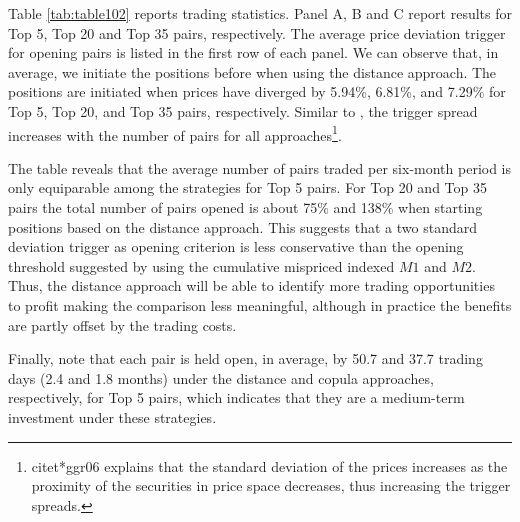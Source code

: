 \documentclass[a4paper]{article}
\begin{document}
	Table \ref{tab:table102} reports trading statistics. Panel A, B and C report results for Top 5, Top 20 and Top 35 pairs, respectively. The average price deviation trigger for opening pairs is listed in the first row of each panel. We can observe that, in average, we initiate the positions before when using the distance approach. The positions are initiated when prices have diverged by 5.94\%, 6.81\%, and 7.29\% for Top 5, Top 20, and Top 35 pairs, respectively. Similar to \citet*{ggr06}, the trigger spread increases with the number of pairs for all approaches\footnote{citet*{ggr06} explains that the standard deviation of the prices increases as the proximity of the securities in price space decreases, thus increasing the trigger spreads.}.
	
	The table reveals that the average number of pairs traded per six-month period is only equiparable among the strategies for Top 5 pairs. For Top 20 and Top 35 pairs the total number of pairs opened is about 75\% and 138\% when starting positions based on the distance approach. This suggests that a two standard deviation trigger as opening criterion is less conservative than the opening threshold suggested by \citet*{rf15} using the cumulative mispriced indexed $M1$ and $M2$. Thus, the distance approach will be able to identify more trading opportunities to profit making the comparison less meaningful, although in practice the benefits are partly offset by the trading costs.
	

%	
%	
%	
%	
	
	Finally, note that each pair is held open, in average, by 50.7 and 37.7 trading days (2.4 and 1.8 months) under the distance and copula approaches, respectively, for Top 5 pairs, which indicates that they are a medium-term investment under these strategies.
	
\end{document}
